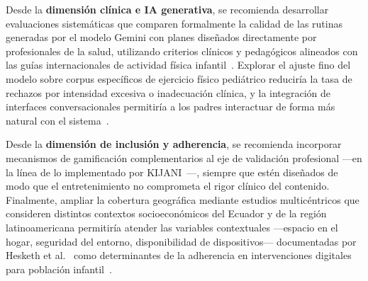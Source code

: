 			Desde la \textbf{dimensión clínica e IA generativa}, se recomienda desarrollar evaluaciones sistemáticas que comparen formalmente la calidad de las rutinas generadas por el modelo Gemini con planes diseñados directamente por profesionales de la salud, utilizando criterios clínicos y pedagógicos alineados con las guías internacionales de actividad física infantil~\cite{Zaleski2026,Dergaa2024}. Explorar el ajuste fino del modelo sobre corpus específicos de ejercicio físico pediátrico reduciría la tasa de rechazos por intensidad excesiva o inadecuación clínica, y la integración de interfaces conversacionales permitiría a los padres interactuar de forma más natural con el sistema~\cite{Yim2024,Sengar2024}.
			
			Desde la \textbf{dimensión de inclusión y adherencia}, se recomienda incorporar mecanismos de gamificación complementarios al eje de validación profesional ---en la línea de lo implementado por KIJANI~\cite{Willinger2024}---, siempre que estén diseñados de modo que el entretenimiento no comprometa el rigor clínico del contenido. Finalmente, ampliar la cobertura geográfica mediante estudios multicéntricos que consideren distintos contextos socioeconómicos del Ecuador y de la región latinoamericana permitiría atender las variables contextuales ---espacio en el hogar, seguridad del entorno, disponibilidad de dispositivos--- documentadas por Hesketh et al.~\cite{VegaDiaz2023} como determinantes de la adherencia en intervenciones digitales para población infantil~\cite{Bull2020}.

